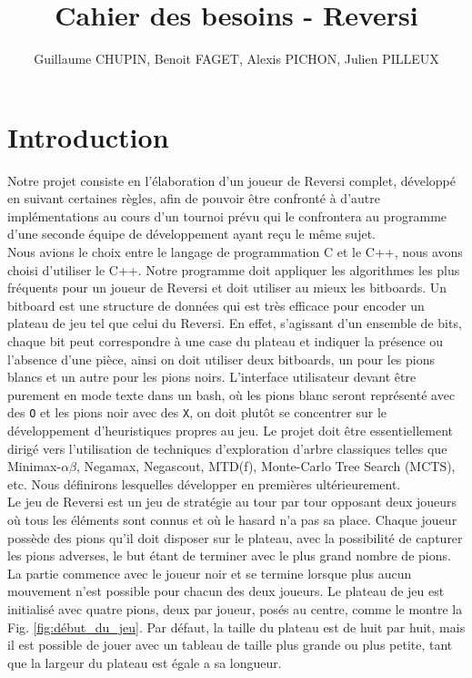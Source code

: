 \documentclass[10pt,a4paper]{article}
\title{Cahier des besoins - Reversi}
\author{Guillaume CHUPIN, Benoit FAGET, Alexis PICHON, Julien PILLEUX}
\begin{document}
\maketitle
\newpage
\tableofcontents
\newpage

\section{Introduction}
\label{sec:intro}
Notre projet consiste en l'élaboration d'un joueur de Reversi complet, développé en suivant certaines règles, afin de pouvoir être confronté à d'autre implémentations au cours d'un tournoi prévu qui le confrontera au programme d'une seconde équipe de développement ayant reçu le même sujet.\\

Nous avions le choix entre le langage de programmation C et le C++, nous avons choisi d'utiliser le C++. Notre programme doit appliquer les algorithmes les plus fréquents pour un joueur de Reversi et doit utiliser au mieux les bitboards. Un bitboard est une structure de données qui est très efficace pour encoder un plateau de jeu tel que celui du Reversi. En effet, s'agissant d'un ensemble de bits, chaque bit peut correspondre à une case du plateau et indiquer la présence ou l'absence d'une pièce, ainsi on doit utiliser deux bitboards, un pour les pions blancs et un autre pour les pions noirs. L'interface utilisateur devant être purement en mode texte dans un bash, où les pions blanc seront représenté avec des \verb!O! et les pions noir avec des \verb!X!, on doit plutôt se concentrer sur le développement d'heuristiques propres au jeu. Le projet doit être essentiellement dirigé vers l'utilisation de techniques d'exploration d'arbre classiques telles que Minimax-$\alpha\beta$, Negamax, Negascout, MTD(f), Monte-Carlo Tree Search (MCTS), etc. Nous définirons lesquelles développer en premières ultérieurement.\\

Le jeu de Reversi est un jeu de stratégie au tour par tour opposant deux joueurs où tous les éléments sont connus et où le hasard n'a pas sa place. Chaque joueur possède des pions qu'il doit disposer sur le plateau, avec la possibilité de capturer les pions adverses, le but étant de terminer avec le plus grand nombre de pions. La partie commence avec le joueur noir et se termine lorsque plus aucun mouvement n'est possible pour chacun des deux joueurs. Le plateau de jeu est initialisé avec quatre pions, deux par joueur, posés au centre, comme le montre la Fig. \ref{fig:début_du_jeu}. Par défaut, la taille du plateau est de huit par huit, mais il est possible de jouer avec un tableau de taille plus grande ou plus petite, tant que la largeur du plateau est égale a sa longueur.
\end{document}

